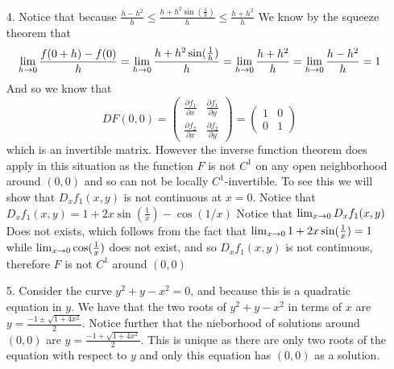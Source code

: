\documentclass[12pt]{amsart}
\begin{document}
\begin{itemize}
   \item[4. ] Notice that because $\frac{h-h^2}{h}\leq \frac{h+h^2\sin(\frac{1}{h})}{h}\leq \frac{h+h^2}{h}$
              We know by the squeeze theorem that 
              \[\lim_{h\rightarrow 0}\frac{f(0+h)-f(0)}{h}=\lim_{h\rightarrow 0}\frac{h+h^2\sin(\frac{1}{h})}{h}
              =\lim_{h\rightarrow 0}\frac{h+h^2}{h}=\lim_{h\rightarrow 0}\frac{h-h^2}{h}=1\]
              And so we know that
              \[DF(0,0)= \begin{pmatrix}
               \frac{\partial f_1}{\partial x} & \frac{\partial f_1}{\partial y}\\ 
               \frac{\partial f_2}{\partial x} & \frac{\partial f_2}{\partial y}
               \end{pmatrix}  = 
               \begin{pmatrix}1 & 0\\ 0 & 1\end{pmatrix}\]
              which is an invertible matrix. However the inverse function theorem does
              apply in this situation as the function $F$ is not $C^1$ on any open 
              neighborhood around $(0,0)$ and so can not be locally $C^1$-invertible. 
              To see this we will show that $D_xf_1(x,y)$ is not continuous at $x=0$.
              Notice that $D_xf_1(x,y)=1+2x\sin(\frac{1}{x})-\cos(1/x)$ Notice that 
              $\lim_{x\rightarrow0}D_xf_1(x,y)$ Does not exists, which follows from the fact that 
              $\lim_{x\rightarrow 0} 1+2x\sin(\frac{1}{x})=1$ while $\lim_{x\rightarrow 0}\cos(\frac{1}{x})$ 
              does not exist, and so $D_xf_1(x,y)$ is not continuous, therefore $F$ is not $C^1$ around $(0,0)$


   \item[5.] Consider the curve $y^2+y-x^2=0$, and because this is a quadratic equation in 
         $y$. We have that the two roots of $y^2+y-x^2$ in terms of $x$ are 
         $y=\frac{-1\pm \sqrt{1+4x^2}}{2}$. Notice further that the nieborhood of solutions around $(0,0)$
         are $y=\frac{-1+ \sqrt{1+4x^2}}{2}$.
         This is unique as there are only two roots of the equation with respect to 
         $y$ and only this equation has $(0,0)$ as a solution.

\end{itemize}

\end{document}

